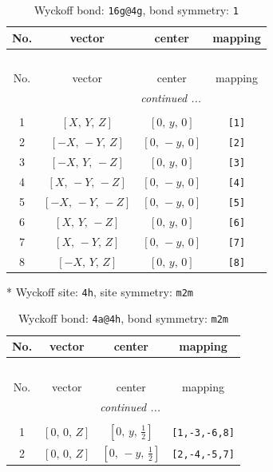 \documentclass[fleqn,8pt]{jsarticle}
\begin{document}
\begin{longtable}{cccc}
\caption{Wyckoff bond: {\tt 16g@4g}, bond symmetry: {\tt 1}}
 \\
 \hline \hline
No. & vector & center & mapping \\ \hline \endfirsthead

\multicolumn{3}{l}{\tablename\ \thetable{}} \\
 \hline \hline
No. & vector & center & mapping \\ \hline \endhead

 \hline \hline
\multicolumn{3}{r}{\footnotesize\it continued ...} \\ \endfoot

 \hline \hline
\multicolumn{3}{r}{} \\ \endlastfoot

1 & $\left[ X,\, Y,\, Z \right]$ & $\left[ 0,\, y,\, 0 \right]$ & {\tt [1]} \\ \hline
2 & $\left[ - X,\, - Y,\, Z \right]$ & $\left[ 0,\, - y,\, 0 \right]$ & {\tt [2]} \\ \hline
3 & $\left[ - X,\, Y,\, - Z \right]$ & $\left[ 0,\, y,\, 0 \right]$ & {\tt [3]} \\ \hline
4 & $\left[ X,\, - Y,\, - Z \right]$ & $\left[ 0,\, - y,\, 0 \right]$ & {\tt [4]} \\ \hline
5 & $\left[ - X,\, - Y,\, - Z \right]$ & $\left[ 0,\, - y,\, 0 \right]$ & {\tt [5]} \\ \hline
6 & $\left[ X,\, Y,\, - Z \right]$ & $\left[ 0,\, y,\, 0 \right]$ & {\tt [6]} \\ \hline
7 & $\left[ X,\, - Y,\, Z \right]$ & $\left[ 0,\, - y,\, 0 \right]$ & {\tt [7]} \\ \hline
8 & $\left[ - X,\, Y,\, Z \right]$ & $\left[ 0,\, y,\, 0 \right]$ & {\tt [8]} \\
\end{longtable}
* Wyckoff site: {\tt 4h}, site symmetry: {\tt m2m}
\renewcommand{\arraystretch}{1.2}
\begin{longtable}{cccc}
\caption{Wyckoff bond: {\tt 4a@4h}, bond symmetry: {\tt m2m}}
 \\
 \hline \hline
No. & vector & center & mapping \\ \hline \endfirsthead

\multicolumn{3}{l}{\tablename\ \thetable{}} \\
 \hline \hline
No. & vector & center & mapping \\ \hline \endhead

 \hline \hline
\multicolumn{3}{r}{\footnotesize\it continued ...} \\ \endfoot

 \hline \hline
\multicolumn{3}{r}{} \\ \endlastfoot

1 & $\left[ 0,\, 0,\, Z \right]$ & $\left[ 0,\, y,\, \frac{1}{2} \right]$ & {\tt [1,-3,-6,8]} \\ \hline
2 & $\left[ 0,\, 0,\, Z \right]$ & $\left[ 0,\, - y,\, \frac{1}{2} \right]$ & {\tt [2,-4,-5,7]} \\
\end{longtable}
\end{document}
